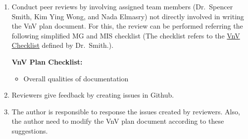 \documentclass[12pt, titlepage]{article}
\begin{document}
\begin{enumerate}

\item  Conduct peer reviews by involving assigned team members (Dr.\ Spencer Smith, Kim Ying Wong, and Nada Elmasry) not directly involved in writing the VnV plan document. For this, the review can be performed referring the following simplified MG and MIS checklist (The checklist refers to the \href{https://github.com/smiths/capTemplate/blob/9251702fdcb9800c59f6ed3d11d91e2bd62fca6d/docs/Checklists/VnV-Checklist.pdf}{VnV Checklist} defined by Dr.\ Smith.). 

\textbf{VnV Plan Checklist:}
\begin{itemize}
    \item Overall qualities of documentation

\end{itemize}

\item Reviewers give feedback by creating issues in Github. 

\item The author is responsible to response the issues created by reviewers. Also, the author need to modify the VnV plan document according to these suggestions. 

\end{enumerate}

     
\end{document}
